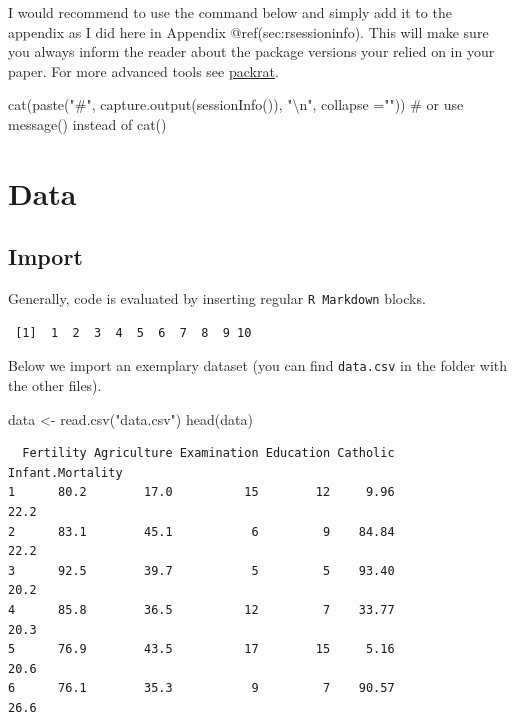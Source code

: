 \documentclass[
  letterpaper,
  DIV=11,
  numbers=noendperiod]{scrartcl}
\newenvironment{Shaded}{\begin{snugshade}}{\end{snugshade}}
\newcommand{\AttributeTok}[1]{\textcolor[rgb]{0.40,0.45,0.13}{#1}}
\newcommand{\CommentTok}[1]{\textcolor[rgb]{0.37,0.37,0.37}{#1}}
\newcommand{\FunctionTok}[1]{\textcolor[rgb]{0.28,0.35,0.67}{#1}}
\newcommand{\NormalTok}[1]{\textcolor[rgb]{0.00,0.23,0.31}{#1}}
\newcommand{\OtherTok}[1]{\textcolor[rgb]{0.00,0.23,0.31}{#1}}
\newcommand{\SpecialCharTok}[1]{\textcolor[rgb]{0.37,0.37,0.37}{#1}}
\newcommand{\StringTok}[1]{\textcolor[rgb]{0.13,0.47,0.30}{#1}}
\begin{document}
I would recommend to use the command below and simply add it to the
appendix as I did here in Appendix @ref(sec:rsessioninfo). This will
make sure you always inform the reader about the package versions your
relied on in your paper. For more advanced tools see
\href{https://rstudio.github.io/packrat/}{packrat}.

\begin{Shaded}
\begin{Highlighting}[]
\FunctionTok{cat}\NormalTok{(}\FunctionTok{paste}\NormalTok{(}\StringTok{"\#"}\NormalTok{, }\FunctionTok{capture.output}\NormalTok{(}\FunctionTok{sessionInfo}\NormalTok{()), }\StringTok{"}\SpecialCharTok{\textbackslash{}n}\StringTok{"}\NormalTok{, }\AttributeTok{collapse =}\StringTok{""}\NormalTok{)) }
  \CommentTok{\# or use message() instead of cat()}
\end{Highlighting}
\end{Shaded}

\hypertarget{data}{%
\section{Data}\label{data}}

\hypertarget{import}{%
\subsection{Import}\label{import}}

Generally, code is evaluated by inserting regular \texttt{R\ Markdown}
blocks.

\begin{verbatim}
 [1]  1  2  3  4  5  6  7  8  9 10
\end{verbatim}

Below we import an exemplary dataset (you can find \texttt{data.csv} in
the folder with the other files).

\begin{Shaded}
\begin{Highlighting}[]
\NormalTok{data }\OtherTok{\textless{}{-}} \FunctionTok{read.csv}\NormalTok{(}\StringTok{"data.csv"}\NormalTok{)}
\FunctionTok{head}\NormalTok{(data)}
\end{Highlighting}
\end{Shaded}

\begin{verbatim}
  Fertility Agriculture Examination Education Catholic Infant.Mortality
1      80.2        17.0          15        12     9.96             22.2
2      83.1        45.1           6         9    84.84             22.2
3      92.5        39.7           5         5    93.40             20.2
4      85.8        36.5          12         7    33.77             20.3
5      76.9        43.5          17        15     5.16             20.6
6      76.1        35.3           9         7    90.57             26.6
\end{verbatim}
\end{document}
